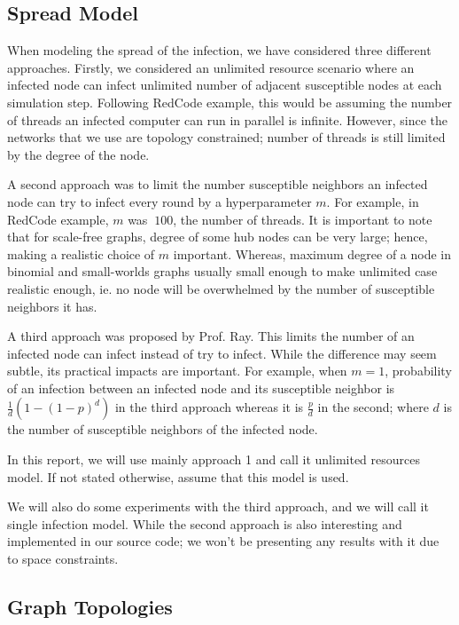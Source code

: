 \documentclass[conference]{IEEEtran}
\begin{document}
\subsection{Spread Model}\label{sec:spread_model}

When modeling the spread of the infection, we have considered three different approaches. Firstly, we considered an unlimited resource scenario where an infected node can infect unlimited number of adjacent susceptible nodes at each simulation step. Following RedCode example, this would be assuming the number of threads an infected computer can run in parallel is infinite. However, since the networks that we use are topology constrained; number of threads is still limited by the degree of the node.

A second approach was to limit the number susceptible neighbors an infected node can try to infect every round by a hyperparameter $m$. For example, in RedCode example, $m$ was $~100$, the number of threads. It is important to note that for scale-free graphs, degree of some hub nodes can be very large; hence, making a realistic choice of $m$ important. Whereas, maximum degree of a node in binomial and small-worlds graphs usually small enough to make unlimited case realistic enough, ie. no node will be overwhelmed by the number of susceptible neighbors it has.

A third approach was proposed by Prof. Ray. This limits the number of an infected node can infect instead of try to infect. While the difference may seem subtle, its practical impacts are important. For example, when $m=1$, probability of an infection between an infected node and its susceptible neighbor is $\frac{1}{d}(1-(1-p)^d)$ in the third approach whereas it is $\frac{p}{d}$ in the second; where $d$ is the number of susceptible neighbors of the infected node.

In this report, we will use mainly approach 1 and call it unlimited resources model. If not stated otherwise, assume that this model is used.

We will also do some experiments with the third approach, and we will call it single infection model. While the second approach is also interesting and implemented in our source code; we won't be presenting any results with it due to space constraints.

\subsection{Graph Topologies}
\end{document}
